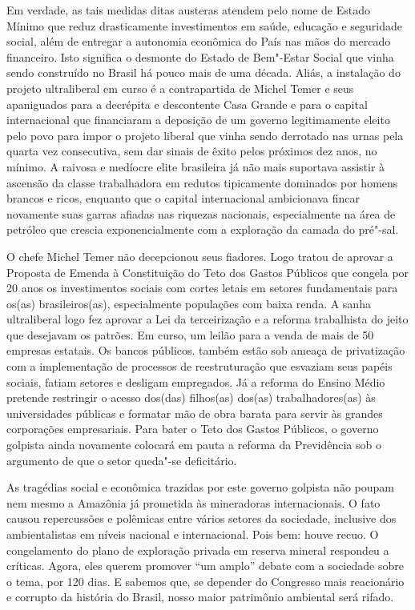 Em verdade, as tais medidas ditas austeras atendem pelo nome de Estado
Mínimo que reduz drasticamente investimentos em saúde, educação e
seguridade social, além de entregar a autonomia econômica do País nas
mãos do mercado financeiro. Isto significa o desmonte do Estado de
Bem"-Estar Social que vinha sendo construído no Brasil há pouco mais de
uma década. Aliás, a instalação do projeto ultraliberal em curso é a
contrapartida de Michel Temer e seus apaniguados para a decrépita e
descontente Casa Grande e para o capital internacional que financiaram a
deposição de um governo legitimamente eleito pelo povo para impor o
projeto liberal que vinha sendo derrotado nas urnas pela quarta vez
consecutiva, sem dar sinais de êxito pelos próximos dez anos, no mínimo.
A raivosa e medíocre elite brasileira já não mais suportava assistir à
ascensão da classe trabalhadora em redutos tipicamente dominados por
homens brancos e ricos, enquanto que o capital internacional ambicionava
fincar novamente suas garras afiadas nas riquezas nacionais,
especialmente na área de petróleo que crescia exponencialmente com a
exploração da camada do pré"-sal.

O chefe Michel Temer não decepcionou seus fiadores. Logo tratou de
aprovar a Proposta de Emenda à Constituição do Teto dos Gastos Públicos
que congela por 20 anos os investimentos sociais com cortes letais em
setores fundamentais para os(as) brasileiros(as), especialmente
populações com baixa renda. A sanha ultraliberal logo fez aprovar a Lei
da terceirização e a reforma trabalhista do jeito que desejavam os
patrões. Em curso, um leilão para a venda de mais de 50 empresas
estatais. Os bancos públicos. também estão sob ameaça de privatização
com a implementação de processos de reestruturação que esvaziam seus
papéis sociais, fatiam setores e desligam empregados. Já a reforma do
Ensino Médio pretende restringir o acesso dos(das) filhos(as) dos(as)
trabalhadores(as) às universidades públicas e formatar mão de obra
barata para servir às grandes corporações empresariais. Para bater o
Teto dos Gastos Públicos, o governo golpista ainda novamente colocará em
pauta a reforma da Previdência sob o argumento de que o setor queda"-se
deficitário.

As tragédias social e econômica trazidas por este governo golpista não
poupam nem mesmo a Amazônia já prometida às mineradoras internacionais.
O fato causou repercussões e polêmicas entre vários setores da
sociedade, inclusive dos ambientalistas em níveis nacional e
internacional. Pois bem: houve recuo. O congelamento do plano de
exploração privada em reserva mineral respondeu a críticas. Agora, eles
querem promover ``um amplo'' debate com a sociedade sobre o tema, por 120
dias. E sabemos que, se depender do Congresso mais reacionário e
corrupto da história do Brasil, nosso maior patrimônio ambiental será
rifado.

